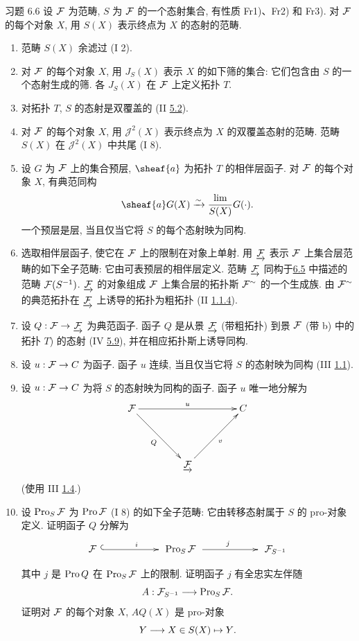 \begin{enonce*}[remark]{习题 6.6}
设 ${\mathcal F}$ 为范畴, $S$ 为 ${\mathcal F}$ 的一个态射集合,
有性质 Fr1)、Fr2) 和 Fr3).
对 ${\mathcal F}$ 的每个对象 $X$, 用 $S(X)$ 表示终点为 $X$ 的态射的范畴.
\begin{enumerate}
\renewcommand{\theenumi}{\alph{enumi}}
\renewcommand{\labelenumi}{\theenumi)}
\item 范畴 $S(X)$ 余滤过 (I 2).

\item 对 ${\mathcal F}$ 的每个对象 $X$,
用 $J_S(X)$ 表示 $X$ 的如下筛的集合:
它们包含由 $S$ 的一个态射生成的筛.
各 $J_S(X)$ 在 ${\mathcal F}$ 上定义拓扑 $T$.

\item 对拓扑 $T$, $S$ 的态射是双覆盖的
(II \hyperref[II.def5.2]{5.2}).

\item 对 ${\mathcal F}$ 的每个对象 $X$,
用 $𝒥^2(X)$ 表示终点为 $X$ 的双覆盖态射的范畴.
范畴 $S(X)$ 在 $𝒥^2(X)$ 中共尾 (I 8).

\item 设 $G$ 为 ${\mathcal F}$ 上的集合预层,
$\sheaf{a}$ 为拓扑 $T$ 的相伴层函子.
对 ${\mathcal F}$ 的每个对象 $X$, 有典范同构
$$
\sheaf{a} G(X) \xrightarrow{\sim} \frac{\lim}{S(X)} G( \cdot ){\quoi}.
$$
一个预层是层, 当且仅当它将 $S$ 的每个态射映为同构.

\item 选取相伴层函子, 使它在 ${\mathcal F}$ 上的限制在对象上单射.
用 $\underrightarrow{{\mathcal F}}$ 表示 ${\mathcal F}$ 上集合层范畴的如下全子范畴:
它由可表预层的相伴层定义.
\pageoriginale 范畴 $\underrightarrow{{\mathcal F}}$ 同构于\hyperref[VI.prop6.5]{6.5}
中描述的范畴 ${\mathcal F}(S^{-1})$.
$\underrightarrow{{\mathcal F}}$ 的对象组成 ${\mathcal F}$ 上集合层的拓扑斯 ${\mathcal F}^{\sim}$ 的一个生成族.
由 ${\mathcal F}^{\sim}$ 的典范拓扑在 $\underrightarrow{{\mathcal F}}$ 上诱导的拓扑为粗拓扑
(II \hyperref[II.subsubsec1.1.4]{1.1.4}).

\item 设 $Q:\Ff\to\underrightarrow{\Ff}$ 为典范函子.
函子 $Q$ 是从景 $\underrightarrow{{\mathcal F}}$ (带粗拓扑)
到景 ${\mathcal F}$ (带 b) 中的拓扑 $T$) 的态射
(IV \hyperref[IV.exer5.9]{5.9}), 并在相应拓扑斯上诱导同构.

\item 设 $u:\Ff\to C$ 为函子.
函子 $u$ 连续, 当且仅当它将 $S$ 的态射映为同构 (III \hyperref[III.def1.1]{1.1}).

\item 设 $u:\Ff\to C$ 为将 $S$ 的态射映为同构的函子.
函子 $u$ 唯一地分解为
\[
\xymatrix@=1.5cm{
  \Ff\ar[rr]^{u} \ar[rd]_{Q}&  & C\\
            & \underrightarrow{\Ff}{} \ar[ru]_{v}&
}
\]
(使用 III \hyperref[III.rem1.4]{1.4}.)

\item 设 $\operatorname{Pro}_S{\mathcal F}$ 为 $\operatorname{Pro}{\mathcal F}$ (I 8) 的如下全子范畴:
它由转移态射属于 $S$ 的 pro-对象定义.
证明函子 $Q$ 分解为
\[
\xymatrix@M=.25cm@C=2cm{
\Ff\ar@{^{(}->}[r]^{i}& \Pro_S\Ff\ar[r]^{j}&
\Ff_{S^{-1}}
}
\]
其中 $j$ 是 $\operatorname{Pro} Q$ 在 $\operatorname{Pro}_S{\mathcal F}$ 上的限制.
证明函子 $j$ 有全忠实左伴随
$$
A : \Ff_{S^{-1}} \to \Pro_S \Ff{\quoi}.
$$
证明对 ${\mathcal F}$ 的每个对象 $X$, $AQ(X)$ 是 pro-对象
$$
Y \to X \in S(X) \mapsto Y{\quoi}.
$$
\end{enumerate}
\end{enonce*}


